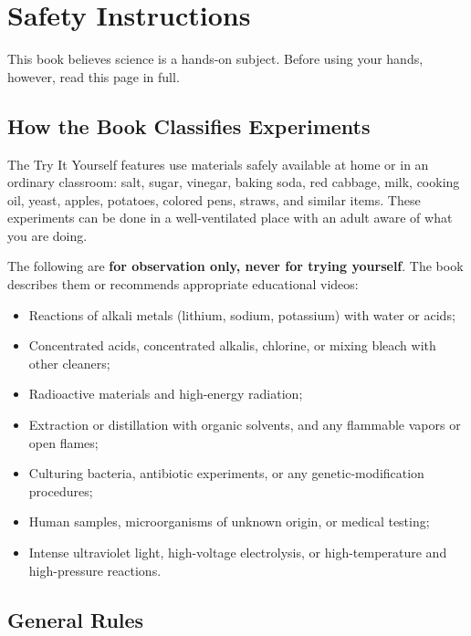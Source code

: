 \chapter*{Safety Instructions}

This book believes science is a hands-on subject. Before using your hands, however, read this page in full.

\section*{How the Book Classifies Experiments}

The Try It Yourself features use materials safely available at home or in an ordinary classroom: salt, sugar, vinegar, baking soda, red cabbage, milk, cooking oil, yeast, apples, potatoes, colored pens, straws, and similar items. These experiments can be done in a well-ventilated place with an adult aware of what you are doing.

The following are \textbf{for observation only, never for trying yourself}. The book describes them or recommends appropriate educational videos:

\begin{itemize}[itemsep=2pt]
\item Reactions of alkali metals (lithium, sodium, potassium) with water or acids;
\item Concentrated acids, concentrated alkalis, chlorine, or mixing bleach with other cleaners;
\item Radioactive materials and high-energy radiation;
\item Extraction or distillation with organic solvents, and any flammable vapors or open flames;
\item Culturing bacteria, antibiotic experiments, or any genetic-modification procedures;
\item Human samples, microorganisms of unknown origin, or medical testing;
\item Intense ultraviolet light, high-voltage electrolysis, or high-temperature and high-pressure reactions.
\end{itemize}

\section*{General Rules}


